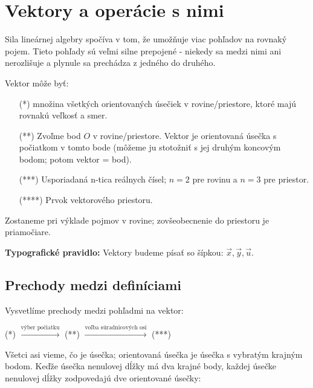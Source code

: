 \section{Vektory a operácie s nimi}

Sila lineárnej algebry spočíva v tom, že umožňuje viac pohľadov na rovnaký pojem. Tieto pohľady sú veľmi silne prepojené - niekedy sa medzi nimi ani nerozlišuje a plynule sa prechádza z jedného do druhého.

\noindent Vektor môže byť:
\begin{itemize}
    \item[(*)] množina všetkých orientovaných úsečiek v rovine/priestore, ktoré majú rovnakú veľkosť a smer.
    \item[(**)] Zvoľme bod $O$ v rovine/priestore. Vektor je orientovaná úsečka s počiatkom v tomto bode (môžeme ju stotožniť s jej druhým koncovým bodom; potom vektor = bod).
    \item[(***)] Usporiadaná n-tica reálnych čísel; $n=2$ pre rovinu a $n=3$ pre priestor.
    \item[(****)] Prvok vektorového priestoru.
\end{itemize}

Zostaneme pri výklade pojmov v rovine; zovšeobecnenie do priestoru je priamočiare.

\noindent \textbf{Typografické pravidlo:}
Vektory budeme písať so šípkou: $\vec{x}, \vec{y}, \vec{u}$.



\subsection{Prechody medzi definíciami}
Vysvetlíme prechody medzi pohľadmi na vektor:
\begin{center}
    (*) $\xrightarrow{\text{výber počiatku}}$ (**) $\xrightarrow{\text{voľba súradnicových osí}}$ (***)
\end{center}

Všetci asi vieme, čo je úsečka; orientovaná úsečka je úsečka s vybratým krajným bodom. Keďže úsečka nenulovej dĺžky má dva krajné body, každej úsečke nenulovej dĺžky zodpovedajú dve orientované úsečky:

\begin{center}
\end{center}

